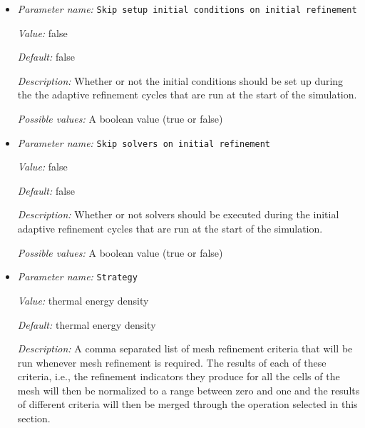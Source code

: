 \begin{itemize}
{\it Value:} false


{\it Default:} false


{\it Description:} Whether or not the postprocessors should be executed after each of the initial adaptive refinement cycles that are run at the start of the simulation.


{\it Possible values:} A boolean value (true or false)
\item {\it Parameter name:} {\tt Skip setup initial conditions on initial refinement}
\label{parameters:Mesh refinement/Skip setup initial conditions on initial refinement}


{\it Value:} false


{\it Default:} false


{\it Description:} Whether or not the initial conditions should be set up during the the adaptive refinement cycles that are run at the start of the simulation.


{\it Possible values:} A boolean value (true or false)
\item {\it Parameter name:} {\tt Skip solvers on initial refinement}
\label{parameters:Mesh refinement/Skip solvers on initial refinement}


{\it Value:} false


{\it Default:} false


{\it Description:} Whether or not solvers should be executed during the initial adaptive refinement cycles that are run at the start of the simulation.


{\it Possible values:} A boolean value (true or false)
\item {\it Parameter name:} {\tt Strategy}
\label{parameters:Mesh refinement/Strategy}


{\it Value:} thermal energy density


{\it Default:} thermal energy density


{\it Description:} A comma separated list of mesh refinement criteria that will be run whenever mesh refinement is required. The results of each of these criteria, i.e., the refinement indicators they produce for all the cells of the mesh will then be normalized to a range between zero and one and the results of different criteria will then be merged through the operation selected in this section.


\end{itemize}
